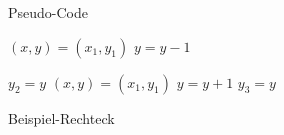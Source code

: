 \begin{figure}[h]
  \centering
\begin{minipage}[t]{0.5\textwidth}
\centering
\vspace{-0.4cm}
\renewcommand\figurename{Algorithm}
\begin{algorithm}[H]
\caption{Pseudo-Code}\label{euclid}
\begin{algorithmic}[1]
\State $(x,y) = (x_1, y_1)$
	\State $ y = y - 1$
\EndWhile

\State $ y_2 = y$
\State $(x,y) = (x_1, y_1)$
	\State $ y = y + 1$
\EndWhile
\State $y_3 = y$
\end{algorithmic}
\end{algorithm}

\end{minipage}\hfill
  \begin{minipage}[t]{0.35\textwidth}
    \centering
    \vspace{-0.2cm}
    \caption{Beispiel-Rechteck}\label{fig:xx}
  \end{minipage}\hfill

\end{figure}
